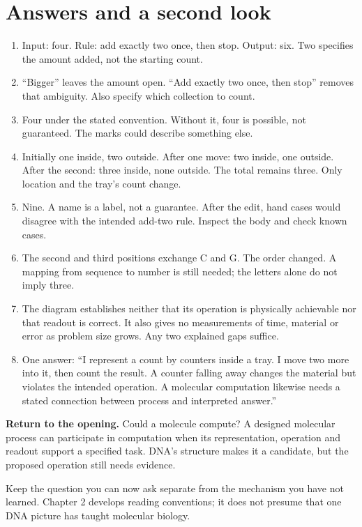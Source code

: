 \clearpage
\section{Answers and a second look}\label{sec:answers}
\begin{enumerate}
\item Input: four. Rule: add exactly two once, then stop. Output: six. Two specifies the amount added, not the starting count.
\item “Bigger” leaves the amount open. “Add exactly two once, then stop” removes that ambiguity. Also specify which collection to count.
\item Four under the stated convention. Without it, four is possible, not guaranteed. The marks could describe something else.
\item Initially one inside, two outside. After one move: two inside, one outside. After the second: three inside, none outside. The total remains three. Only location and the tray's count change.
\item Nine. A name is a label, not a guarantee. After the edit, hand cases would disagree with the intended add-two rule. Inspect the body and check known cases.
\item The second and third positions exchange C and G. The order changed. A mapping from sequence to number is still needed; the letters alone do not imply three.
\item The diagram establishes neither that its operation is physically achievable nor that readout is correct. It also gives no measurements of time, material or error as problem size grows. Any two explained gaps suffice.
\item One answer: “I represent a count by counters inside a tray. I move two more into it, then count the result. A counter falling away changes the material but violates the intended operation. A molecular computation likewise needs a stated connection between process and interpreted answer.”
\end{enumerate}
\textbf{Return to the opening.} Could a molecule compute? A designed molecular process can participate in computation when its representation, operation and readout support a specified task. DNA's structure makes it a candidate, but the proposed operation still needs evidence.

Keep the question you can now ask separate from the mechanism you have not learned. Chapter 2 develops reading conventions; it does not presume that one DNA picture has taught molecular biology.
